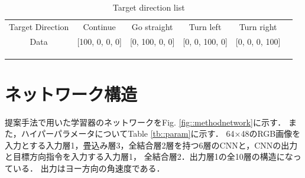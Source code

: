  \begin{table}[h]
      \centering
      \caption{Target direction list}
      \begin{tabular}{ccccll}
      \cline{1-5}
      \multicolumn{1}{|c|}{Target Direction} & \multicolumn{1}{c|}{Continue}&\multicolumn{1}{c|}{Go straight}          & \multicolumn{1}{c|}{Turn left}          & \multicolumn{1}{c|}{Turn right}          &  \\ \cline{1-5}
      \multicolumn{1}{|c|}{Data}  &\multicolumn{1}{c|}{{[}100, 0, 0, 0{]}}& \multicolumn{1}{c|}{{[}0, 100, 0, 0{]}} & \multicolumn{1}{c|}{{[}0, 0, 100, 0{]}} & \multicolumn{1}{l|}{{[}0, 0, 0, 100{]}} &  \\ \cline{1-5}
                                 &                                  &                                  &                                  &  \\
                                 &                                  &                                  &                                  &  \\
      \multicolumn{1}{l}{}       &                                  &                                  &                                  & 
      \end{tabular}
      \vspace{-3.0zh}
      \label{tb:command_4}
      \end{table}
\newpage
\section{ネットワーク構造}
\label{net}
提案手法で用いた学習器のネットワークをFig. \ref{fig::methodnetwork}に示す．
また，ハイパーパラメータについてTable \ref{tb::param}に示す．
64×48のRGB画像を入力とする入力層1，畳込み層3，全結合層2層を持つ6層のCNNと，CNNの出力と目標方向指令を入力する入力層1，
全結合層2．出力層1の全10層の構造になっている．
出力はヨー方向の角速度である．

